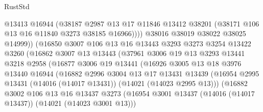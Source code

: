 \begin{lexlean}{RustStd}
\begin{coremodule}
                            @13413
                            @16944
                            (@38187
                              @2987
                              @13
                              @17
                              @11846
                              @13412
                              @38201
                              (@38171 @106 @13 @16 @11840 @3273 @38185 @16966))))
                        @38016
                        @38019
                        @38022
                        @38025
                        @14999))
                    (@16850
                      @3007
                      @106
                      @13
                      @16
                      @13443
                      @3293
                      @3273
                      @3254
                      @13422
                      @3260
                      (@16862
                        @3007
                        @13
                        @13443
                        (@37961
                          @3006
                          @19
                          @13
                          @3293
                          @13441
                          @3218
                          @2958
                          (@16877
                            @3006
                            @19
                            @13441
                            (@16926
                              @3005
                              @13
                              @18
                              @3976
                              @13440
                              @16944
                              (@16882
                                @2996
                                @3004
                                @13
                                @17
                                @13431
                                @13439
                                (@16954
                                  @2995
                                  @13431
                                  (@14016 (@14017 @13431))
                                  (@14021 (@14023 @2995 @13)))
                                (@16882
                                  @3002
                                  @106
                                  @13
                                  @16
                                  @13437
                                  @3273
                                  (@16954
                                    @3001
                                    @13437
                                    (@14016 (@14017 @13437))
                                    (@14021 (@14023 @3001 @13)))

\end{coremodule}
\end{lexlean}
